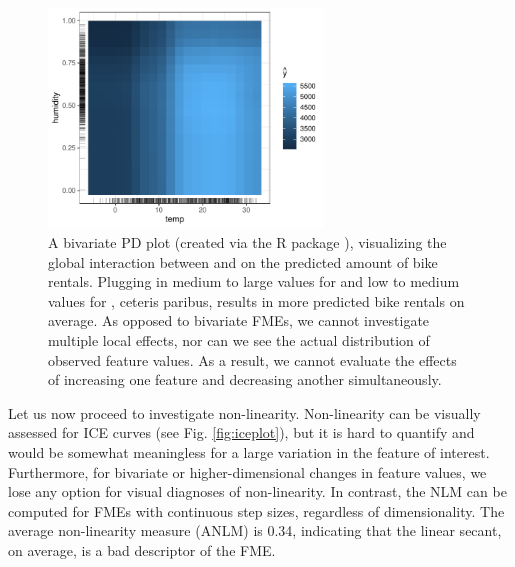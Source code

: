 \begin{figure}[H]
    \centering
    \includegraphics[width = 0.65\textwidth]{figures/pdplot_bivariate.pdf}
    \caption{A bivariate PD plot (created via the R package ), 
    visualizing the global interaction between  and  on the predicted amount of bike rentals. Plugging in medium to large values for  and low to medium values for , ceteris paribus, results in more predicted bike rentals on average. 
    As opposed to bivariate FMEs, we cannot investigate multiple local effects, nor can we see the actual distribution of observed feature values. As a result, we cannot evaluate the effects of increasing one feature and decreasing another simultaneously.
    }
    \label{fig:bivariate_pdp}
\end{figure}
Let us now proceed to investigate non-linearity. Non-linearity can be visually assessed for ICE curves (see Fig. \ref{fig:iceplot}), but it is hard to quantify and would be somewhat meaningless for a large variation in the feature of interest. Furthermore, for bivariate or higher-dimensional changes in feature values, we lose any option for visual diagnoses of non-linearity. In contrast, the NLM can be computed for FMEs with continuous step sizes, regardless of dimensionality. The average non-linearity measure (ANLM) is 0.34, indicating that the linear secant, on average, is a bad descriptor of the FME.

